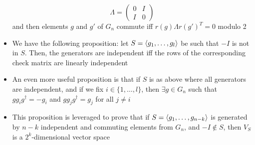\documentclass[12pt,a4paper]{article}
\numberwithin{equation}{section}
\begin{document}
\begin{itemize}
		\begin{equation}
			\Lambda=\begin{pmatrix}0&I\\I&0\end{pmatrix}
		\end{equation}
		and then elements $g$ and $g'$ of $G_{n}$ commute iff $r(g)\Lambda r(g')^{T}=0$ modulo 2
		\item We have the following proposition: let $S=\braket{g_{1},\ldots,g_{l}}$ be such that $-I$ is not in $S$. Then, the generators are independent iff the rows of the corresponding check matrix are linearly independent
		\item An even more useful proposition is that if $S$ is as above where all generators are independent, and if we fix $i\in\{1,\ldots, l\}$, then $\exists g\in G_{n}$ such that $gg_{i}g^{\dagger}=-g_{i}$ and $gg_{j}g^{\dagger}=g_{j}$ for all $j\neq i$
		\item This proposition is leveraged to prove that if $S=\braket{g_{1},\ldots, g_{n-k}}$ is generated by $n-k$ independent and commuting elements from $G_{n}$, and $-I\notin S$, then $V_{S}$ is a $2^{k}$-dimensional vector space
	\end{itemize}
\end{document}
